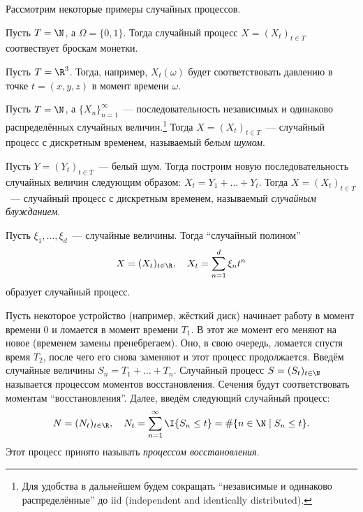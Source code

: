 Рассмотрим некоторые примеры случайных процессов.
\begin{example}
	Пусть \(T = \N\), а \(\Omega = \{0, 1\}\). Тогда случайный процесс \(X = 
	(X_t)_{t \in T}\) соотвествует броскам монетки.
\end{example}
\begin{example}
	Пусть \(T = \R^{3}\). Тогда, например, \(X_{t}(\omega)\) будет 
	соответствовать давлению в точке \(t = (x, y, z)\) в момент времени 
	\(\omega\).
\end{example}
\begin{example}
	Пусть \(T = \N\), а \(\{X_{n}\}_{n = 1}^{\infty}\)~--- последовательность 
	независимых и одинаково распределённых случайных величин.\footnote{Для 
	удобства в дальнейшем будем сокращать ``независимые и одинаково 
	распределённые'' до iid (independent and identically distributed).} Тогда 
	\(X = (X_t)_{t \in T}\)~--- случайный процесс с дискретным временем, 
	называемый \emph{белым шумом}. 
\end{example}
\begin{example}
	Пусть \(Y = (Y_t)_{t \in T}\)~--- белый шум. Тогда построим новую 
	последовательность случайных величин следующим образом: \(X_{t} = Y_{1} + 
	\ldots + Y_{t}\). Тогда \(X = (X_{t})_{t \in T}\)~--- случайный процесс с 
	дискретным временем, называемый \emph{случайным блужданием}. 
\end{example}
\begin{example}
	Пусть \(\xi_{1}, \ldots, \xi_{d}\)~--- случайные величины. Тогда 
	``случайный полином''
	\[
		X = (X_{t})_{t \in \R}, \quad X_t = \sum_{n = 1}^{d} \xi_{n}t^{n}
	\]
	образует случайный процесс.
\end{example}
\begin{example}\label{counting-process}
	Пусть некоторое устройство (например, жёсткий диск) начинает работу в 
	момент времени 0 и ломается в момент времени \(T_{1}\). В этот же момент 
	его меняют на новое (временем замены пренебрегаем). Оно, в свою очередь, 
	ломается спустя время \(T_{2}\), после чего его снова заменяют и этот 
	процесс продолжается. Введём случайные величины \(S_{n} = T_{1} + \dots + 
	T_{n}\). Случайный процесс \(S = (S_{t})_{t \in \N}\) называется процессом 
	моментов восстановления. Сечения будут соответствовать моментам 
	``восстановления''. Далее, введём следующий случайный процесс:
	\[
		N = (N_{t})_{t \in \R}, \quad N_{t} = \sum_{n = 1}^{\infty} 
		\I\{S_{n} \leq t\} = \#\{n \in \N \mid S_{n} \leq t\}.
	\]
	Этот процесс принято называть \emph{процессом восстановления}.
\end{example}

